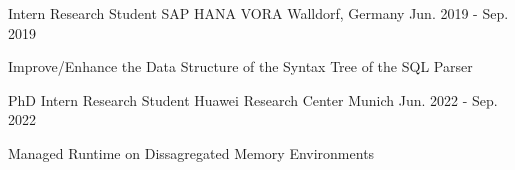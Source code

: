 
\begin{cventries}

	\cventry
	{Intern Research Student} %
	{SAP HANA VORA} %
	{Walldorf, Germany} %
	{Jun. 2019 - Sep. 2019} %
	{
		\begin{cvitems} %
			\item {Improve/Enhance the Data Structure of the Syntax Tree of
			            the SQL Parser}
		\end{cvitems}
	}


	\cventry
	{PhD Intern Research Student} %
	{Huawei Research Center} %
	{Munich} %
	{Jun. 2022 - Sep. 2022} %
	{
		\begin{cvitems} %
			\item {Managed Runtime on Dissagregated Memory Environments}
		\end{cvitems}
	}

\end{cventries}
